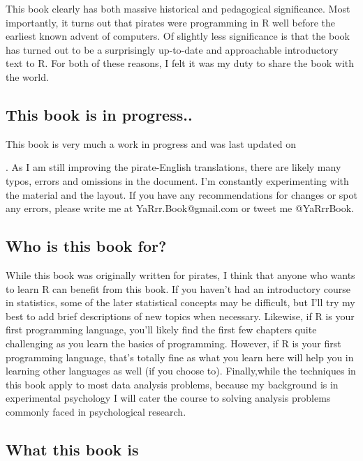 \documentclass{tufte-book}\usepackage[]{graphicx}\usepackage[]{color}
\begin{document}
This book clearly has both massive historical and pedagogical significance. Most importantly, it turns out that pirates were programming in R well before the earliest known advent of computers. Of slightly less significance is that the book has turned out to be a surprisingly up-to-date and approachable introductory text to R. For both of these reasons, I felt it was my duty to share the book with the world.

\subsection{This book is in progress..}

This book is very much a work in progress and was last updated on \date{}. As I am still improving the pirate-English translations, there are likely many typos, errors and omissions in the document. I'm constantly experimenting with the material and the layout. If you have any recommendations for changes or spot any errors, please write me at YaRrr.Book@gmail.com or tweet me @YaRrrBook.


\subsection{Who is this book for?}

While this book was originally written for pirates, I think that anyone who wants to learn R can benefit from this book. If you haven't had an introductory course in statistics, some of the later statistical concepts may be difficult, but I'll try my best to add brief descriptions of new topics when necessary. Likewise, if R is your first programming language, you'll likely find the first few chapters quite challenging as you learn the basics of programming. However, if R is your first programming language, that's totally fine as what you learn here will help you in learning other languages as well (if you choose to). Finally,while the techniques in this book apply to most data analysis problems, because my background is in experimental psychology I will cater the course to solving analysis problems commonly faced in psychological research.

\subsection{What this book \textbf{is}}
\end{document}
